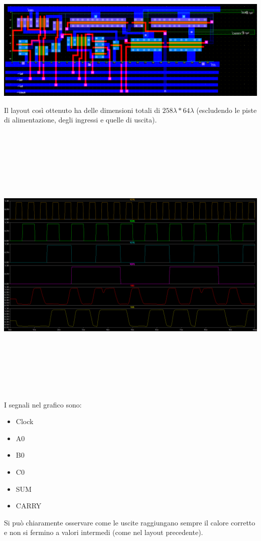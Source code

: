 \documentclass[12pt]{article} %
\begin{document}
\includegraphics[scale = 0.35]{NuovoLayout_258x64}

Il layout così ottenuto ha delle dimensioni totali di  $258 \lambda * 64 \lambda$ (escludendo le piste di alimentazione, degli ingressi e quelle di uscita).

\includegraphics[width = 160mm, height = 140mm]{uscita_dimensioni_corrette}
I segnali nel grafico sono:
\begin{itemize}
\item Clock
\item A0
\item B0
\item C0
\item SUM
\item CARRY
\end{itemize}
Si può chiaramente osservare come le uscite raggiungano sempre il calore corretto e non si fermino a valori intermedi (come nel layout precedente).
\end{document}
